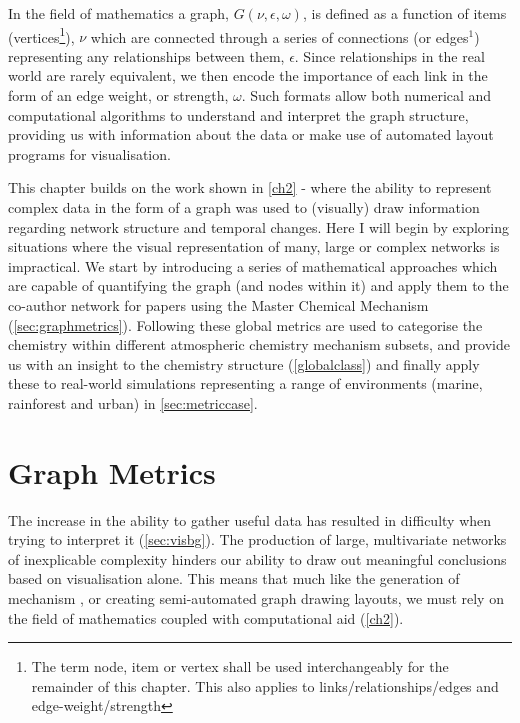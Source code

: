 In the field of mathematics a graph, $G(\nu,\epsilon,\omega)$, is defined as a function of items (vertices\footnote{The term node, item or vertex shall be used interchangeably for the remainder of this chapter. This also applies to links/relationships/edges and edge-weight/strength}), $\nu$ which are connected through a series of connections (or edges$^1$) representing any relationships between them, $\epsilon$. Since relationships in the real world are rarely equivalent, we then encode the importance of each link in the form of an edge weight, or strength, $\omega$. Such formats allow both numerical and computational algorithms to understand and interpret the graph structure, providing us with information about the data or make use of automated layout programs for visualisation. 


This chapter builds on the work shown in \autoref{ch2} - where 
the ability to represent complex data in the form of a graph was used to (visually) draw information regarding network structure and temporal changes. Here I will begin by exploring situations where the visual representation of many, large or complex networks is impractical. We start by introducing a series of mathematical approaches which are capable of quantifying the graph (and nodes within it) and apply them to the co-author network for papers using the Master Chemical Mechanism (\autoref{sec:graphmetrics}). Following these global metrics are used to categorise the chemistry within different atmospheric chemistry mechanism subsets, and provide us with an insight to the chemistry structure (\autoref{globalclass}) and finally apply these to real-world simulations representing a range of environments (marine, rainforest and urban) in \autoref{sec:metriccase}.
% 
% 
% 

\section{Graph Metrics}\label{sec:graphmetrics}

The increase in the ability to gather useful data has resulted in difficulty when trying to interpret it (\autoref{sec:visbg}). The production of large, multivariate networks of inexplicable complexity hinders our ability to draw out meaningful conclusions based on visualisation alone. This means that much like the generation of mechanism \citep{protocol}, or creating semi-automated graph drawing layouts, we must rely on the field of mathematics coupled with computational aid (\autoref{ch2}).

